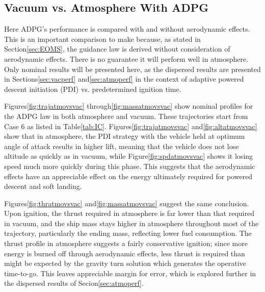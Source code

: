 \subsection{Vacuum vs. Atmosphere With ADPG} \label{sec:atmovsvac}
Here ADPG's performance is compared with and without aerodynamic effects. This is an important comparison to make because, as stated in Section\:\ref{sec:EOMS}, the guidance law is derived without consideration of aerodynamic effects. There is no guarantee it will perform well in atmosphere. Only nominal results will be presented here, as the dispersed results are presented in Sections\:\ref{sec:vacperf} and\:\ref{sec:atmoperf} in the context of adaptive powered descent initiation (PDI) vs. predetermined ignition time.

Figures\:\ref{fig:trajatmovsvac} through\:\ref{fig:massatmovsvac} show nominal profiles for the ADPG law in both atmosphere and vacuum. These trajectories start from Case 6 as listed in Table\:\ref{tab:IC}. Figures\:\ref{fig:trajatmovsvac} and\:\ref{fig:altatmovsvac} show that in atmosphere, the PDI strategy with the vehicle held at optimum angle of attack results in higher lift, meaning that the vehicle does not lose altitude as quickly as in vacuum, while Figure\:\ref{fig:spdatmovsvac} shows it losing speed much more quickly during this phase. This suggests that the aerodynamic effects have an appreciable effect on the energy ultimately required for powered descent and soft landing. 

Figures\:\ref{fig:thratmovsvac} and\:\ref{fig:massatmovsvac} suggest the same conclusion. Upon ignition, the thrust required in atmosphere is far lower than that required in vacuum, and the ship mass stays higher in atmosphere throughout most of the trajectory, particularly the ending mass, reflecting lower fuel consumption. The thrust profile in atmosphere suggests a fairly conservative ignition; since more energy is burned off through aerodynamic effects, less thrust is required than might be expected by the gravity turn solution which generates the operative time-to-go. This leaves appreciable margin for error, which is explored further in the dispersed results of Secion\:\ref{sec:atmoperf}.


